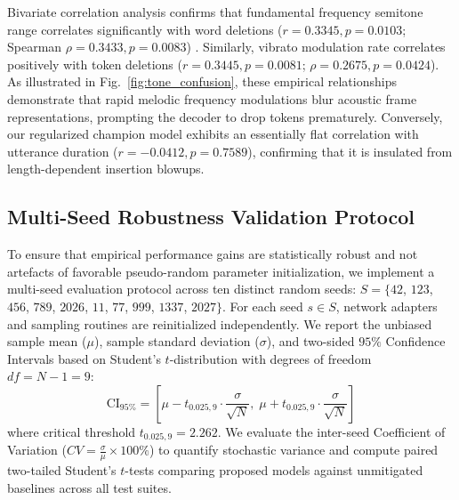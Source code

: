 Bivariate correlation analysis confirms that fundamental frequency semitone range correlates significantly with word deletions ($r = 0.3345, p = 0.0103$; Spearman $\rho = 0.3433, p = 0.0083$) \cite{pearson1895notes,spearman1904proof}. Similarly, vibrato modulation rate correlates positively with token deletions ($r = 0.3445, p = 0.0081$; $\rho = 0.2675, p = 0.0424$). As illustrated in Fig.~\ref{fig:tone_confusion}, these empirical relationships demonstrate that rapid melodic frequency modulations blur acoustic frame representations, prompting the decoder to drop tokens prematurely. Conversely, our regularized champion model exhibits an essentially flat correlation with utterance duration ($r = -0.0412, p = 0.7589$), confirming that it is insulated from length-dependent insertion blowups.

\subsection{Multi-Seed Robustness Validation Protocol}
To ensure that empirical performance gains are statistically robust and not artefacts of favorable pseudo-random parameter initialization, we implement a multi-seed evaluation protocol across ten distinct random seeds: $S = \{42$, $123$, $456$, $789$, $2026$, $11$, $77$, $999$, $1337$, $2027\}$. For each seed $s \in S$, network adapters and sampling routines are reinitialized independently. We report the unbiased sample mean ($\mu$), sample standard deviation ($\sigma$), and two-sided $95\%$ Confidence Intervals based on Student's $t$-distribution with degrees of freedom $df = N - 1 = 9$:
\begin{equation}
\text{CI}_{95\%} = \left[ \mu - t_{0.025, 9} \cdot \frac{\sigma}{\sqrt{N}}, \; \mu + t_{0.025, 9} \cdot \frac{\sigma}{\sqrt{N}} \right]
\end{equation}
where critical threshold $t_{0.025, 9} = 2.262$. We evaluate the inter-seed Coefficient of Variation ($CV = \frac{\sigma}{\mu} \times 100\%$) to quantify stochastic variance and compute paired two-tailed Student's $t$-tests comparing proposed models against unmitigated baselines across all test suites.

